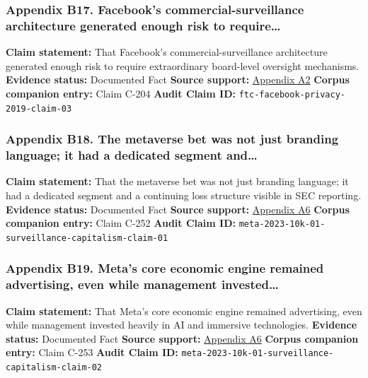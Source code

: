 \documentclass[
  american,
  11pt,
  letterpaper,
]{article}
\begin{document}
\subsubsection{Appendix B17. Facebook's commercial-surveillance
architecture generated enough risk to
require\ldots{}}\label{appendix-b17-facebooks-commercial-surveillance-architecture-generated-enough-risk-to-require}

\textbf{Claim statement:} That Facebook's commercial-surveillance
architecture generated enough risk to require extraordinary board-level
oversight mechanisms. \textbf{Evidence status:} Documented Fact
\textbf{Source support:}
\hyperref[appendix-a2-ftc-imposes-5-billion-penalty-and-sweeping-new-privacy-restrictions-on-facebook]{Appendix
A2} \textbf{Corpus companion entry:} Claim C-204 \textbf{Audit Claim
ID:} \texttt{ftc-facebook-privacy-2019-claim-03}

\subsubsection{Appendix B18. The metaverse bet was not just branding
language; it had a dedicated segment
and\ldots{}}\label{appendix-b18-the-metaverse-bet-was-not-just-branding-language-it-had-a-dedicated-segment-and}

\textbf{Claim statement:} That the metaverse bet was not just branding
language; it had a dedicated segment and a continuing loss structure
visible in SEC reporting. \textbf{Evidence status:} Documented Fact
\textbf{Source support:}
\hyperref[appendix-a6-meta-platforms-inc-2023-annual-report-form-10-k]{Appendix
A6} \textbf{Corpus companion entry:} Claim C-252 \textbf{Audit Claim
ID:} \texttt{meta-2023-10k-01-surveillance-capitalism-claim-01}

\subsubsection{Appendix B19. Meta's core economic engine remained
advertising, even while management
invested\ldots{}}\label{appendix-b19-meta-s-core-economic-engine-remained-advertising-even-while-management-invested}

\textbf{Claim statement:} That Meta's core economic engine remained
advertising, even while management invested heavily in AI and immersive
technologies. \textbf{Evidence status:} Documented Fact \textbf{Source
support:}
\hyperref[appendix-a6-meta-platforms-inc-2023-annual-report-form-10-k]{Appendix
A6} \textbf{Corpus companion entry:} Claim C-253 \textbf{Audit Claim
ID:} \texttt{meta-2023-10k-01-surveillance-capitalism-claim-02}
\end{document}
